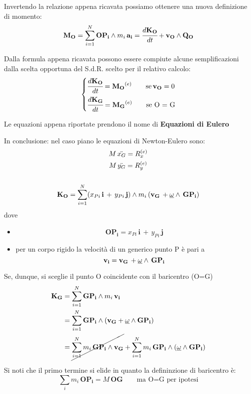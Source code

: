 Invertendo la relazione appena ricavata possiamo ottenere una nuova definizione di momento:
\[\mathbf{M_O} = \sum_{i=1}^N \mathbf{OP_i}\wedge m_i\,\mathbf{a_i} = \cfrac{d\mathbf{K_O}}{dt} + \mathbf{v_O}\wedge \mathbf{Q_O}\]

Dalla formula appena ricavata possono essere compiute alcune semplificazioni dalla scelta opportuna del S.d.R. scelto per il relativo calcolo:
\[
\begin{dcases}
\cfrac{d\mathbf{K_O}}{dt} = \mathbf{M_O}^{(e)}\qquad \text{se}\, \mathbf{v_O} = 0\\
\cfrac{d\mathbf{K_G}}{dt} = \mathbf{M_G} ^{(e)}\qquad \text{se O = G} 
\end{dcases}
\]

Le equazioni appena riportate prendono il nome di \textbf{Equazioni di Eulero}

In conclusione: nel caso piano le equazioni di Newton-Eulero sono:
\begin{gather*}
	M\,\ddot{x_G} = R_x^{(e)}\\
	M\,\ddot{y_G} = R_y^{(e)}\\
	\\
	\mathbf{K_O} = \sum_{i=1}^N (x_{Pi}\,\mathbf{i}\,+\,y_{Pi}\,\mathbf{j})\wedge m_i\,(\mathbf{v_G}\,+\underline{\omega}\wedge\,\mathbf{GP_i})
\end{gather*}
dove
\begin{itemize}
\item \[\mathbf{OP_i} = x_{Pi}\,\mathbf{i}\,+\,y_{Pi}\,\mathbf{j}\]
\item per un corpo rigido la velocità di un generico punto P è pari a 
\[\mathbf{v_i} = \mathbf{v_G}\,+\underline{\omega}\wedge\,\mathbf{GP_i}\]
\end{itemize}

Se, dunque, si sceglie il punto O coincidente con il baricentro (O=G)
\begin{align*}
\mathbf{K_G} &= \sum_{i=1}^N \mathbf{GP_i}\wedge m_i\,\mathbf{v_i}\\
&= \sum_{i=1}^N \mathbf{GP_i}\wedge (\mathbf{v_G} + \underline{\omega}\wedge \mathbf{GP_i})\\
&= \cancel{\sum_{i=1}^N m_i\,\mathbf{GP_i}\wedge \mathbf{v_G}} + \sum_{i=1}^N m_i\,\mathbf{GP_i}\wedge (\underline{\omega}\wedge\mathbf{GP_i})
\end{align*}

Si noti che il primo termine si elide in quanto la defininzione di baricentro è:
\[\sum_i m_i\,\mathbf{OP_i} = M\,\mathbf{OG}\qquad\text{ma  O=G per ipotesi}\]

